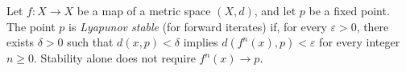 
Let $f:X\to X$ be a map of a metric space $(X,d)$, and let $p$ be a fixed point. The point $p$ is \emph{Lyapunov stable} (for forward iterates) if, for every $\varepsilon>0$, there exists $\delta>0$ such that $d(x,p)<\delta$ implies $d(f^n(x),p)<\varepsilon$ for every integer $n\ge0$. Stability alone does not require $f^n(x)\to p$.
